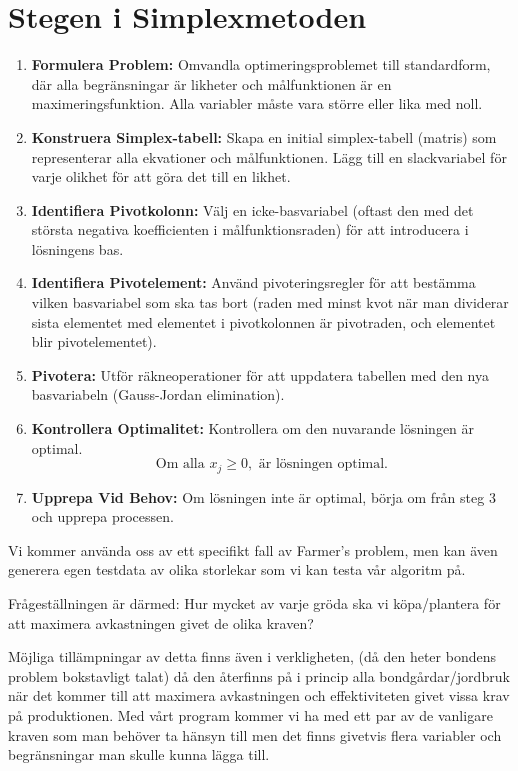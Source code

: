 \documentclass{article}
\begin{document}
\section*{Stegen i Simplexmetoden}
\begin{enumerate}
    \item \textbf{Formulera Problem:} Omvandla optimeringsproblemet till standardform, där alla begränsningar är likheter och målfunktionen är en maximeringsfunktion. Alla variabler måste vara större eller lika med noll.
    
    \item \textbf{Konstruera Simplex-tabell:} Skapa en initial simplex-tabell (matris) som representerar alla ekvationer och målfunktionen. Lägg till en slackvariabel för varje olikhet för att göra det till en likhet.
    
    \item \textbf{Identifiera Pivotkolonn:} Välj en icke-basvariabel (oftast den med det största negativa koefficienten i målfunktionsraden) för att introducera i lösningens bas.
    
    \item \textbf{Identifiera Pivotelement:} Använd pivoteringsregler för att bestämma vilken basvariabel som ska tas bort (raden med minst kvot när man dividerar sista elementet med elementet i pivotkolonnen är pivotraden, och elementet blir pivotelementet).
    
    \item \textbf{Pivotera:} Utför räkneoperationer för att uppdatera tabellen med den nya basvariabeln (Gauss-Jordan elimination).
    
    \item \textbf{Kontrollera Optimalitet:} Kontrollera om den nuvarande lösningen är optimal.
    \[
    \text{Om alla } x_j \geq 0, \text{ är lösningen optimal.}
    \]
    
    \item \textbf{Upprepa Vid Behov:} Om lösningen inte är optimal, börja om från steg 3 och upprepa processen.
\end{enumerate}

Vi kommer använda oss av ett specifikt fall av Farmer’s problem, men kan även generera egen testdata av olika storlekar som vi kan testa vår algoritm på. 

Frågeställningen är därmed: Hur mycket av varje gröda ska vi köpa/plantera för att maximera avkastningen givet de olika kraven?

Möjliga tillämpningar av detta finns även i verkligheten, (då den heter bondens problem bokstavligt talat) då den återfinns på i princip alla bondgårdar/jordbruk när det kommer till att maximera avkastningen och effektiviteten givet vissa krav på produktionen. Med vårt program kommer vi ha med ett par av de vanligare kraven som man behöver ta hänsyn till men det finns givetvis flera variabler och begränsningar man skulle kunna lägga till.
\end{document}
